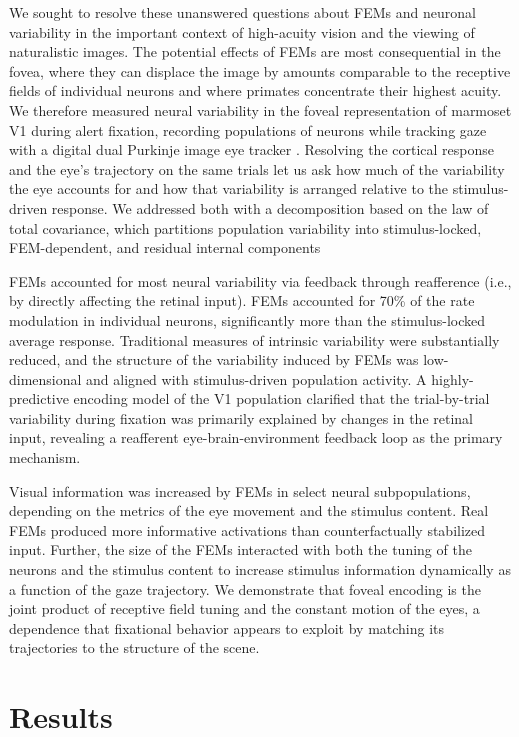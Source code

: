 \documentclass{lite}
\begin{document}
We sought to resolve these unanswered questions about FEMs and neuronal variability in the important context of high-acuity vision and the viewing of naturalistic images. The potential effects of FEMs are most consequential in the fovea, where they can displace the image by amounts comparable to the receptive fields of individual neurons and where primates concentrate their highest acuity. We therefore measured neural variability in the foveal representation of marmoset V1 during alert fixation, recording populations of neurons while tracking gaze with a digital dual Purkinje image eye tracker \cite{yates2023detailed, ressmeyer2025openirisdpi, wu2023high}. Resolving the cortical response and the eye's trajectory on the same trials let us ask how much of the variability the eye accounts for and how that variability is arranged relative to the stimulus-driven response. We addressed both with a decomposition based on the law of total covariance, which partitions population variability into stimulus-locked, FEM-dependent, and residual internal components

FEMs accounted for most neural variability via feedback through reafference (i.e., by directly affecting the retinal input). FEMs accounted for 70\% of the rate modulation in individual neurons, significantly more than the stimulus-locked average response. Traditional measures of intrinsic variability were substantially reduced, and the structure of the variability induced by FEMs was low-dimensional and aligned with stimulus-driven population activity. A highly-predictive encoding model of the V1 population clarified that the trial-by-trial variability during fixation was primarily explained by changes in the retinal input, revealing a reafferent eye-brain-environment feedback loop as the primary mechanism.

Visual information was increased by FEMs in select neural subpopulations, depending on the metrics of the eye movement and the stimulus content. Real FEMs produced more informative activations than counterfactually stabilized input. Further, the size of the FEMs interacted with both the tuning of the neurons and the stimulus content to increase stimulus information dynamically as a function of the gaze trajectory. We demonstrate that foveal encoding is the joint product of receptive field tuning and the constant motion of the eyes, a dependence that fixational behavior appears to exploit by matching its trajectories to the structure of the scene.

\section{Results}
\end{document}

